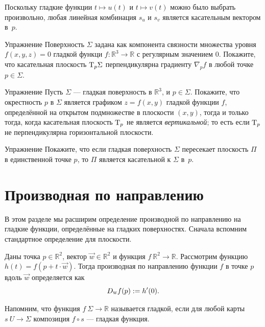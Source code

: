 Поскольку гладкие функции $t\mapsto u(t)$ и $t\mapsto v(t)$ можно было выбрать произвольно, любая линейная комбинация $s_u$ и $s_v$ является касательным вектором в~$p$. 
\qeds

\begin{thm}{Упражнение}\label{ex:tangent-normal}
Поверхность $\Sigma$ задана как компонента связности множества уровня $f(x,y,z)=0$ гладкой функци $f:\mathbb{R}^3\to\mathbb{R}$ с регулярным значением $0$.
Покажите, что касательная плоскость $\mathrm{T}_p\Sigma$ перпендикулярна градиенту $\nabla_pf$ в любой точке $p\in\Sigma$.
\end{thm}

{\sloppy

\begin{thm}{Упражнение}\label{ex:vertical-tangent}
Пусть $\Sigma$ --- гладкая поверхность в $\mathbb{R}^3$, и $p\in\Sigma$.
Покажите, что окрестность $p$ в $\Sigma$ является графиком $z=f(x,y)$ гладкой функции $f$, определённой на открытом подмножестве в плоскости $(x,y)$, тогда и только тогда, когда касательная плоскость $\mathrm{T}_p$ не является {}\emph{вертикальной}; то есть если $\mathrm{T}_p$ не перпендикулярна горизонтальной плоскости.
\end{thm}

}

\begin{thm}{Упражнение}\label{ex:tangent-single-point}
Покажите, что если гладкая поверхность $\Sigma$ пересекает плоскость $\Pi$ в единственной точке $p$, то $\Pi$ является касательной к $\Sigma$ в~$p$.
\end{thm}

\section{Производная по направлению}\label{sec:dirder}

В этом разделе мы расширим определение производной по направлению на гладкие функции, определённые на гладких поверхностях.
Сначала вспомним стандартное определение для плоскости.

Даны точка $p\in \mathbb{R}^2$, вектор $\vec w\in \mathbb{R}^2$ и функция $f\:\mathbb{R}^2\to\mathbb{R}$.
Рассмотрим функцию
$h(t)=f(p+t\cdot\vec w)$.
Тогда производная по направлению функции $f$ в точке $p$ вдоль $\vec w$ определяется как 
\[D_{\text{\sc{w}}}f(p)\mathrel{:=} h'(0).\]

Напомним, что функция $f\: \Sigma \to \mathbb{R}$ называется гладкой, если для любой карты $s\: U \to \Sigma$ композиция $f \circ s$ --- гладкая функция.

